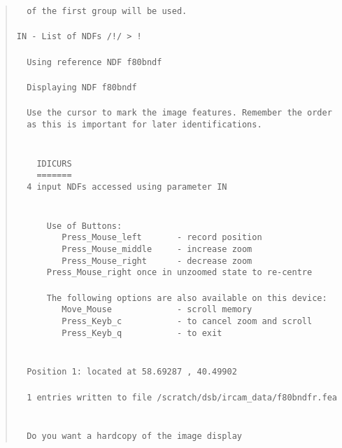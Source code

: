 \begin{quote}
\begin{tabbing}
\verb#  of the first group will be used.#\\
\verb##\\
\verb#IN - List of NDFs /!/ > !# \\
\verb##\\
\verb#  Using reference NDF f80bndf#\\
\verb##\\
\verb#  Displaying NDF f80bndf#\\
\verb##\\
\verb#  Use the cursor to mark the image features. Remember the order#\\
\verb#  as this is important for later identifications.#\\
\verb##\\
\verb##\\
\verb#    IDICURS#\\
\verb#    =======#\\
\verb#  4 input NDFs accessed using parameter IN# \\
\verb##\\
\verb##\\
\verb#      Use of Buttons:#\\
\verb#         Press_Mouse_left       - record position#\\
\verb#         Press_Mouse_middle     - increase zoom#\\
\verb#         Press_Mouse_right      - decrease zoom#\\
\verb#      Press_Mouse_right once in unzoomed state to re-centre#\\
\verb##\\
\verb#      The following options are also available on this device:#\\
\verb#         Move_Mouse             - scroll memory#\\
\verb#         Press_Keyb_c           - to cancel zoom and scroll#\\
\verb#         Press_Keyb_q           - to exit#\\
\verb##\\
\verb##\\
\verb#  Position 1: located at 58.69287 , 40.49902#\\
\verb##\\
\verb#  1 entries written to file /scratch/dsb/ircam_data/f80bndfr.fea#\\
\verb##\\
\verb##\\
\verb#  Do you want a hardcopy of the image display#\\

\end{tabbing}
\end{quote}
